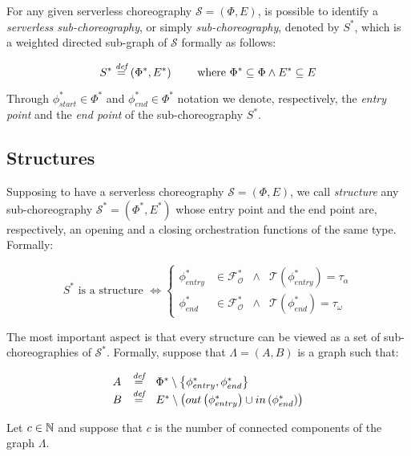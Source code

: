 For any given serverless choreography $\mathcal{S} = (\Phi,E)$, is possible to identify a \textit{serverless sub-choreography}, or simply \textit{sub-choreography}, denoted by $S^*$, which is a weighted directed sub-graph of $\mathcal{S}$ formally as follows:

\begin{equation}
	S^* \overset{\textit{def}}{=} (\Phi^*,E^*) \qquad \text{ where } \Phi^* \subseteq \Phi \wedge E^* \subseteq E
\end{equation}

Through $\phi_{start}^* \in \Phi^*$ and $\phi_{end}^* \in \Phi^*$ notation we denote, respectively, the \textit{entry point} and the \textit{end point} of the sub-choreography $S^*$.

\subsection{Structures}

Supposing to have a serverless choreography $\mathcal{S} = (\Phi,E)$, we call \textit{structure} any sub-choreography $\mathcal{S}^*= (\Phi^*,E^*)$ whose entry point and the end point are, respectively, an opening and a closing orchestration functions of the same type. Formally:

\begin{equation}
	S^* \text{ is a structure } \Leftrightarrow \left\{ \begin{array}{rlll}
		\phi_{entry}^* & \in \mathscr{F_O^*} & \wedge & \mathscr{T}(\phi_{entry}^*) = \tau_{\alpha} \\ 
		\phi_{end}^* & \in \mathscr{F_O^*} & \wedge & \mathscr{T}(\phi_{end}^*) = \tau_{\omega}
	\end{array} \right.
\end{equation}

The most important aspect is that every structure can be viewed as a set of sub-choreographies of $\mathcal{S}^*$. Formally, suppose that $\Lambda = (A,B)$ is a graph such that:

\begin{equation}
\begin{array}{lll}
	A & \overset{\textit{def}}{=} & \Phi^* \setminus \left\lbrace \phi_{entry}^*,\phi_{end}^* \right\rbrace   \\
	B & \overset{\textit{def}}{=} & E^* \setminus \left( out\left(\phi_{entry}^*\right) \cup in\left(\phi_{end}^*\right) \right)
\end{array}
\end{equation}

Let $c \in \mathbb{N}$ and suppose that $c$ is the number of connected components of the graph $\Lambda$.

